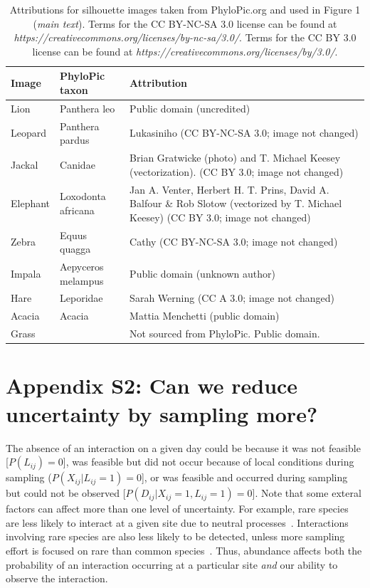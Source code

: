 \documentclass[12pt]{article}
\begin{document}
  \begin{table}[h!]
  \caption{Attributions for silhouette images taken from PhyloPic.org and used in Figure 1 (\emph{main text}). Terms for the CC BY-NC-SA 3.0 license can be found at \emph{https://creativecommons.org/licenses/by-nc-sa/3.0/}. Terms for the CC BY 3.0 license can be found at \emph{https://creativecommons.org/licenses/by/3.0/}.}
  \begin{tabular}{l|l m{10cm}}
  Image & PhyloPic taxon & Attribution \\
  \hline
  Lion & Panthera leo & Public domain (uncredited) \\
  Leopard & Panthera pardus & Lukasiniho (CC BY-NC-SA 3.0; image not changed) \\
  Jackal & Canidae & Brian Gratwicke (photo) and T. Michael Keesey (vectorization). (CC BY 3.0; image not changed) \\
  Elephant & Loxodonta africana & Jan A. Venter, Herbert H. T. Prins, David A. Balfour \& Rob Slotow (vectorized by T. Michael Keesey) (CC BY 3.0; image not changed) \\
  Zebra & Equus quagga & Cathy (CC BY-NC-SA 3.0; image not changed) \\
  Impala & Aepyceros melampus & Public domain (unknown author) \\
  Hare & Leporidae & Sarah Werning (CC A 3.0; image not changed) \\
  Acacia & Acacia & Mattia Menchetti (public domain) \\
  Grass & & Not sourced from PhyloPic. Public domain. \\
  \hline
  \end{tabular}
  \end{table}


\clearpage


\section*{Appendix S2: Can we reduce uncertainty by sampling more?}

  
        The absence of an interaction on a given day could be because it was not feasible [$P(L_{ij}) = 0$], was feasible but did not occur because of local conditions during sampling ($P(X_{ij}|L_{ij} = 1) = 0$], or was feasible and occurred during sampling but could not be observed [$P(D_{ij}|X_{ij} = 1,L_{ij} = 1) = 0$]. Note that some exteral factors can affect more than one level of uncertainty. For example, rare species are less likely to interact at a given site due to neutral processes~\citep{Jordano2016,Graham2018}. Interactions involving rare species are also less likely to be detected, unless more sampling effort is focused on rare than common species~\citep{Bartomeus2013,Jordano2016}. Thus, abundance affects both the probability of an interaction occurring at a particular site \emph{and} our ability to observe the interaction. 
\end{document}
